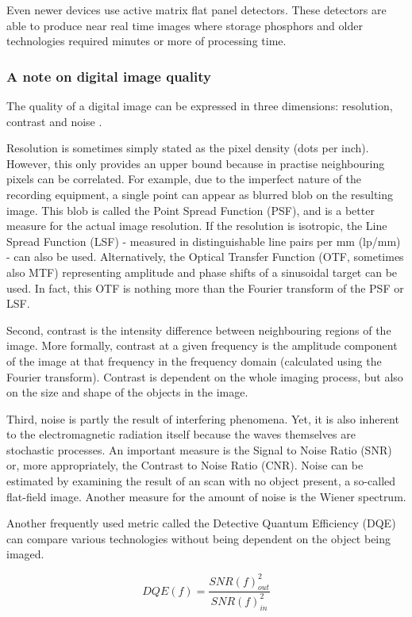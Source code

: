 Even newer devices use active matrix flat panel detectors. These detectors are
able to produce near real time images where storage phosphors and older
technologies required minutes or more of processing time.

\subsubsection{A note on digital image quality}
The quality of a digital image can be expressed in three dimensions: resolution,
contrast and noise \cite{suetens}.

Resolution is sometimes simply stated as the pixel density (dots per inch).
However, this only provides an upper bound because in practise neighbouring
pixels can be correlated. For example, due to the imperfect nature of the
recording equipment, a single point can appear as blurred blob on the resulting
image. This blob is called the Point Spread Function (PSF), and is a better
measure for the actual image resolution. If the resolution is isotropic, the
Line Spread Function (LSF) - measured in distinguishable line pairs per mm
(lp/mm) - can also be used. Alternatively, the Optical Transfer Function (OTF,
sometimes also MTF) representing amplitude and phase shifts of a sinusoidal
target can be used. In fact, this OTF is nothing more than the Fourier transform
of the PSF or LSF.

Second, contrast is the intensity difference between neighbouring regions of the
image. More formally, contrast at a given frequency is the amplitude component
of the image at that frequency in the frequency domain (calculated using the
Fourier transform). Contrast is dependent on the whole imaging process, but also
on the size and shape of the objects in the image. 

Third, noise is partly the result of interfering phenomena. Yet, it is also
inherent to the electromagnetic radiation itself because the waves themselves
are stochastic processes. An important measure is the Signal to Noise Ratio
(SNR) or, more appropriately, the Contrast to Noise Ratio (CNR). Noise can be
estimated by examining the result of an scan with no object present, a so-called
flat-field image. Another measure for the amount of noise is the Wiener
spectrum.

Another frequently used metric called the Detective Quantum Efficiency (DQE) can
compare various technologies without being dependent on the object being imaged.

\begin{equation}
DQE(f) = \frac{SNR(f)_{out}^2}{SNR(f)_{in}^2}
\end{equation}

